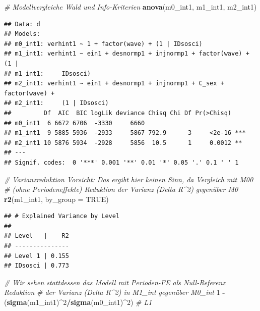 \documentclass[
]{book}
\newenvironment{Shaded}{\begin{snugshade}}{\end{snugshade}}
\newcommand{\CommentTok}[1]{\textcolor[rgb]{0.56,0.35,0.01}{\textit{#1}}}
\newcommand{\DataTypeTok}[1]{\textcolor[rgb]{0.13,0.29,0.53}{#1}}
\newcommand{\DecValTok}[1]{\textcolor[rgb]{0.00,0.00,0.81}{#1}}
\newcommand{\KeywordTok}[1]{\textcolor[rgb]{0.13,0.29,0.53}{\textbf{#1}}}
\newcommand{\NormalTok}[1]{#1}
\newcommand{\OperatorTok}[1]{\textcolor[rgb]{0.81,0.36,0.00}{\textbf{#1}}}
\newcommand{\OtherTok}[1]{\textcolor[rgb]{0.56,0.35,0.01}{#1}}
\newcommand{\StringTok}[1]{\textcolor[rgb]{0.31,0.60,0.02}{#1}}
\begin{document}
\begin{Shaded}
\begin{Highlighting}[]
\CommentTok{# Modellvergleiche Wald und Info-Kriterien}
\KeywordTok{anova}\NormalTok{(m0_int1, m1_int1, m2_int1)}
\end{Highlighting}
\end{Shaded}

\begin{verbatim}
## Data: d
## Models:
## m0_int1: verhint1 ~ 1 + factor(wave) + (1 | IDsosci)
## m1_int1: verhint1 ~ ein1 + desnormp1 + injnormp1 + factor(wave) + (1 | 
## m1_int1:     IDsosci)
## m2_int1: verhint1 ~ ein1 + desnormp1 + injnormp1 + C_sex + factor(wave) + 
## m2_int1:     (1 | IDsosci)
##         Df  AIC  BIC logLik deviance Chisq Chi Df Pr(>Chisq)    
## m0_int1  6 6672 6706  -3330     6660                            
## m1_int1  9 5885 5936  -2933     5867 792.9      3     <2e-16 ***
## m2_int1 10 5876 5934  -2928     5856  10.5      1     0.0012 ** 
## ---
## Signif. codes:  0 '***' 0.001 '**' 0.01 '*' 0.05 '.' 0.1 ' ' 1
\end{verbatim}

\begin{Shaded}
\begin{Highlighting}[]
\CommentTok{# Varianzreduktion Vorsicht: Das ergibt hier keinen Sinn, da Vergleich mit M00}
\CommentTok{# (ohne Periodeneffekte) Reduktion der Varianz (Delta R^2) gegenüber M0}
\KeywordTok{r2}\NormalTok{(m1_int1, }\DataTypeTok{by_group =} \OtherTok{TRUE}\NormalTok{)}
\end{Highlighting}
\end{Shaded}

\begin{verbatim}
## # Explained Variance by Level
## 
## Level   |    R2
## ---------------
## Level 1 | 0.155
## IDsosci | 0.773
\end{verbatim}

\begin{Shaded}
\begin{Highlighting}[]
\CommentTok{# Wir sehen stattdessen das Modell mit Perioden-FE als Null-Referenz Reduktion}
\CommentTok{# der Varianz (Delta R^2) in M1_int gegenüber M0_int}
\DecValTok{1} \OperatorTok{-}\StringTok{ }\NormalTok{(}\KeywordTok{sigma}\NormalTok{(m1_int1)}\OperatorTok{^}\DecValTok{2}\OperatorTok{/}\KeywordTok{sigma}\NormalTok{(m0_int1)}\OperatorTok{^}\DecValTok{2}\NormalTok{)  }\CommentTok{# L1}
\end{Highlighting}
\end{Shaded}
\end{document}
